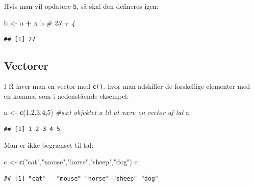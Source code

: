 \documentclass[
]{book}
\newenvironment{Shaded}{\begin{snugshade}}{\end{snugshade}}
\newcommand{\CommentTok}[1]{\textcolor[rgb]{0.56,0.35,0.01}{\textit{#1}}}
\newcommand{\DecValTok}[1]{\textcolor[rgb]{0.00,0.00,0.81}{#1}}
\newcommand{\FunctionTok}[1]{\textcolor[rgb]{0.13,0.29,0.53}{\textbf{#1}}}
\newcommand{\NormalTok}[1]{#1}
\newcommand{\OtherTok}[1]{\textcolor[rgb]{0.56,0.35,0.01}{#1}}
\newcommand{\SpecialCharTok}[1]{\textcolor[rgb]{0.81,0.36,0.00}{\textbf{#1}}}
\newcommand{\StringTok}[1]{\textcolor[rgb]{0.31,0.60,0.02}{#1}}
\theoremstyle{definition}
\theoremstyle{definition}
\theoremstyle{definition}
\theoremstyle{definition}
\theoremstyle{remark}
\begin{document}
Hvis man vil opdatere \texttt{b}, så skal den defineres igen:

\begin{Shaded}
\begin{Highlighting}[]
\NormalTok{b }\OtherTok{\textless{}{-}}\NormalTok{ a }\SpecialCharTok{+}\NormalTok{ x}
\NormalTok{b }\CommentTok{\# 23 + 4}
\end{Highlighting}
\end{Shaded}

\begin{verbatim}
## [1] 27
\end{verbatim}

\subsection{Vectorer}\label{vectorer}

I R laver man en vector med \texttt{c()}, hvor man adskiller de forskellige elementer med en komma, som i nedenstående eksempel:

\begin{Shaded}
\begin{Highlighting}[]
\NormalTok{a }\OtherTok{\textless{}{-}} \FunctionTok{c}\NormalTok{(}\DecValTok{1}\NormalTok{,}\DecValTok{2}\NormalTok{,}\DecValTok{3}\NormalTok{,}\DecValTok{4}\NormalTok{,}\DecValTok{5}\NormalTok{) }\CommentTok{\#sæt objektet \textquotesingle{}a\textquotesingle{} til at være en vector af tal }
\NormalTok{a}
\end{Highlighting}
\end{Shaded}

\begin{verbatim}
## [1] 1 2 3 4 5
\end{verbatim}

Man er ikke begrænset til tal:

\begin{Shaded}
\begin{Highlighting}[]
\NormalTok{c }\OtherTok{\textless{}{-}} \FunctionTok{c}\NormalTok{(}\StringTok{"cat"}\NormalTok{,}\StringTok{"mouse"}\NormalTok{,}\StringTok{"horse"}\NormalTok{,}\StringTok{"sheep"}\NormalTok{,}\StringTok{"dog"}\NormalTok{)}
\NormalTok{c}
\end{Highlighting}
\end{Shaded}

\begin{verbatim}
## [1] "cat"   "mouse" "horse" "sheep" "dog"
\end{verbatim}
\end{document}
